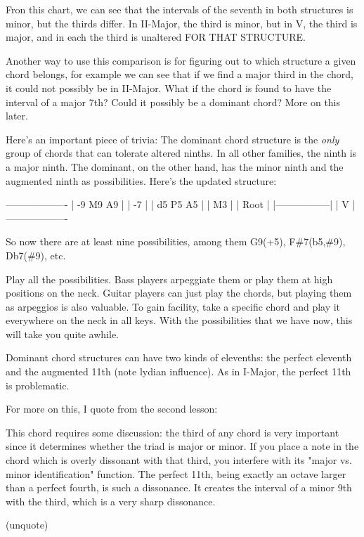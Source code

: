 Fron this chart, we can see that the intervals of the seventh in both
structures is minor, but the thirds differ. In II-Major, the third is
minor, but in V, the third is major, and in each the third is unaltered
FOR THAT STRUCTURE.

Another way to use this comparison is for figuring out to which structure
a given chord belongs, for example we can see that if we find a major
third in the chord, it could not possibly be in II-Major. What if the
chord is found to have the interval of a major 7th? Could it possibly
be a dominant chord? More on this later.

Here's an important piece of trivia: The dominant chord structure is the
\emph{only} group of chords that can tolerate altered ninths. In all other
families, the ninth is a major ninth. The dominant, on the other hand,
has the minor ninth and the augmented ninth as possibilities. Here's the
updated structure:

-------------------
| -9    M9   A9   |
|       -7        |
|  d5   P5   A5   |
|       M3        |
|      Root       |
|-----------------|
|        V        |
-------------------

So now there are at least nine possibilities, among them G9(+5), F\#7(b5,\#9),
Db7(\#9), etc.

Play all the possibilities. Bass players arpeggiate them or play them at high
positions on the neck. Guitar players can just play the chords, but playing
them as arpeggios is also valuable. To gain facility, take a specific chord
and play it everywhere on the neck in all keys. With the possibilities that
we have now, this will take you quite awhile.

Dominant chord structures can have two kinds of elevenths: the perfect
eleventh and the augmented 11th (note lydian influence). As in I-Major,
the perfect 11th is problematic.

For more on this, I quote from the second lesson:

This chord requires some discussion: the third of any chord is very
important since it determines whether the triad is major or minor.
If you place a note in the chord which is overly dissonant with that
third, you interfere with its "major vs. minor identification" function.
The perfect 11th, being exactly an octave larger than a perfect fourth,
is such a dissonance. It creates the interval of a minor 9th with the
third, which is a very sharp dissonance.

(unquote)

